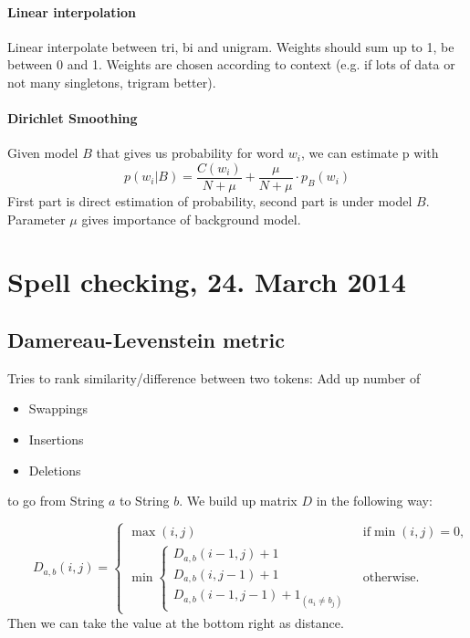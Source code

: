 \documentclass[11pt]{article}
\begin{document}
\paragraph{Linear interpolation}
Linear interpolate between tri, bi and unigram. Weights should sum up to 1, be between 0 and 1.
Weights are chosen according to context (e.g. if lots of data or not many singletons, trigram better). 
\paragraph{Dirichlet Smoothing}
Given model $B$ that gives us probability for word $w_i$, we can estimate p with
\begin{equation}
	p(w_i|B) = \frac{C(w_i)}{N + \mu} + \frac{\mu}{N + \mu}\cdot p_B(w_i)
\end{equation}
First part is direct estimation of probability, second part is under model $B$. Parameter $\mu$ gives
importance of background model.
\section{Spell checking, 24. March 2014}

\subsection{Damereau-Levenstein metric}
\label{sub:levenstein}
Tries to rank similarity/difference between two tokens: Add up number of
\begin{itemize}
	\item Swappings
	\item Insertions
	\item Deletions
\end{itemize}
to go from String $a$ to String $b$. We build up matrix $D$ in the following way:

\begin{equation}
	\qquad D_{a,b}(i,j) = \begin{cases}
  \max(i,j) & \text{ if} \min(i,j)=0, \\
  \min \begin{cases}
          D_{a,b}(i-1,j) + 1 \\
          D_{a,b}(i,j-1) + 1 \\
          D_{a,b}(i-1,j-1) + 1_{(a_i \neq b_j)}
       \end{cases} & \text{ otherwise.}
\end{cases}
\end{equation}
Then we can take the value at the bottom right as distance.
\end{document}

